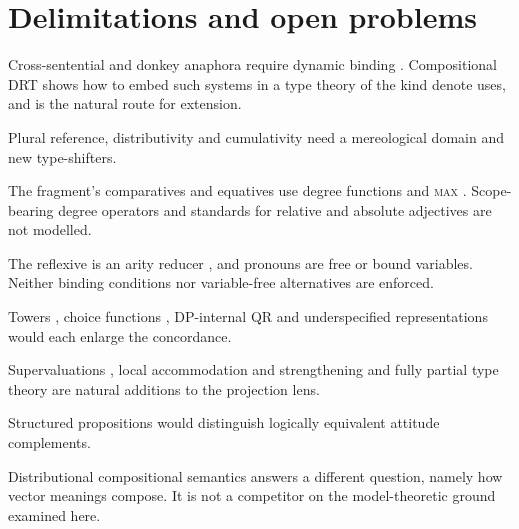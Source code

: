 \documentclass[11pt,a4paper]{article}
\newcommand{\dn}{\textsf{denote}}
\theoremstyle{definition}
\begin{document}
\section{Delimitations and open problems}\label{sec:limits}

\begin{description}[style=unboxed,leftmargin=0pt]\sloppy
\item[Dynamic semantics.] Cross-sentential and donkey anaphora require dynamic binding \citep{kamp1981,heim1982,groenendijkstokhof1991}. Compositional DRT \citep{muskens1996} shows how to embed such systems in a type theory of the kind \dn{} uses, and is the natural route for extension.
\item[Plurality and mereology.] Plural reference, distributivity and cumulativity \citep{link1983,champollion2017} need a mereological domain and new type-shifters.
\item[Degrees.] The fragment's comparatives and equatives use degree functions and \textsc{max} \citep{cresswell1976,rullmann1995}. Scope-bearing degree operators \citep{heim2000} and standards for relative and absolute adjectives \citep{kennedy2007} are not modelled.
\item[Binding.] The reflexive is an arity reducer \citep{bachpartee1980}, and pronouns are free or bound variables. Neither binding conditions \citep{buring2005} nor variable-free alternatives \citep{jacobson1999} are enforced.
\item[Scope.] Towers \citep{barkershan2014}, choice functions \citep{reinhart1997,winter1997}, DP-internal QR \citep{sauerland2005} and underspecified representations \citep{reyle1993,copestakeetal2005} would each enlarge the concordance.
\item[Partiality.] Supervaluations \citep{vanfraassen1966}, local accommodation and strengthening \citep{fox2013} and fully partial type theory \citep{muskens1995} are natural additions to the projection lens.
\item[Hyper\-intensionality.] Structured propositions \citep{cresswell1985} would distinguish logically equivalent attitude complements.
\item[Other notions of compositionality.] Distributional compositional semantics \citep{baronietal2014} answers a different question, namely how vector meanings compose. It is not a competitor on the model-theoretic ground examined here.
\end{description}
\end{document}
